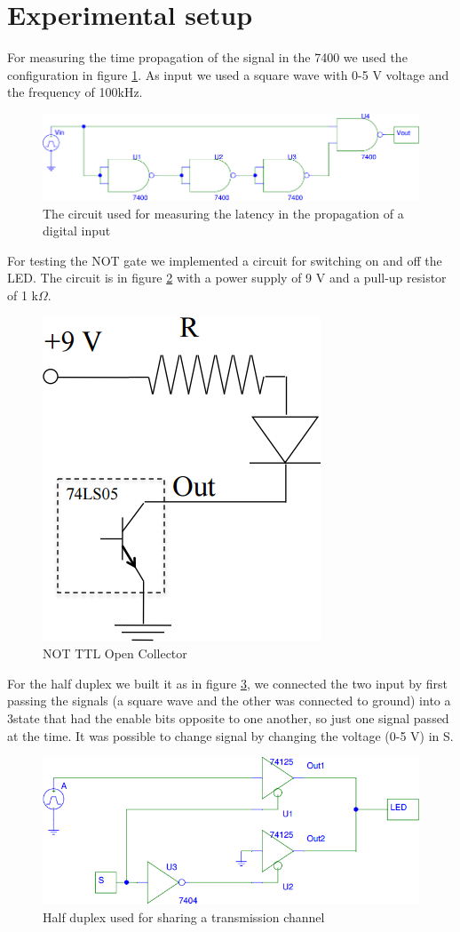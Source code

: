 \section{Experimental setup}
For measuring the time propagation of the signal in the 7400 we used the configuration in figure \ref{latency}. As input we used a square wave with 0-5 V voltage and the frequency of 100kHz.
\begin{figure}[H]
\centering
\includegraphics[width=.7\textwidth]{10/latency.png}
\caption{The circuit used for measuring the latency in the propagation of a digital input}\label{latency}
\end{figure}
For testing the NOT gate we implemented a circuit for switching on and off the LED. The circuit is in figure \ref{LED_ON_OFF} with a power supply of 9 V and a pull-up resistor of 1 k$\Omega$.
\begin{figure}[H]
\centering
\includegraphics[width=.3\textwidth]{10/LED_ON_OFF.png}
\caption{NOT TTL Open Collector}\label{LED_ON_OFF}
\end{figure}
For the half duplex we built it as in figure \ref{TTL_3state}, we connected the two input by first passing the signals (a square wave and the other was connected to ground) into a 3state that had the enable bits opposite to one another, so just one signal passed at the time. It was possible to change signal by changing the voltage (0-5 V) in S.
\begin{figure}[H]
\centering
\includegraphics[width=.7\textwidth]{10/TTL_3state.png}
\caption{Half duplex used for sharing a transmission channel}\label{TTL_3state}
\end{figure}

